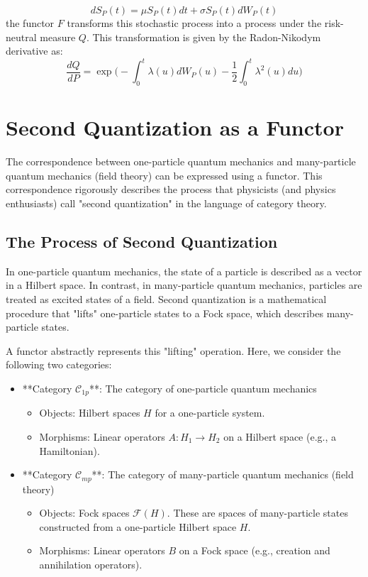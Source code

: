 \documentclass[uplatex,a4j,12pt,dvipdfmx]{jsarticle}
\begin{document}
$$
	d S_{P} (t)
	=
	\mu S_{P} (t) dt
	+
	\sigma S_{P} (t) dW_{P}(t)
$$
the functor $F$ transforms this stochastic process into a process under the risk-neutral measure $Q$. This transformation is given by the Radon-Nikodym derivative as:
$$
	\frac{dQ}{dP}
	=
	\exp \Big(
	- \int_{0}^{t} \lambda(u) d W_{P} (u)
	- \frac{1}{2} \int^{t}_{0} \lambda^{2} (u) du
	\Big)
$$




\section{Second Quantization as a Functor}

The correspondence between one-particle quantum mechanics and many-particle quantum mechanics (field theory) can be expressed using a functor. This correspondence rigorously describes the process that physicists (and physics enthusiasts) call "second quantization" in the language of category theory.

\subsection{The Process of Second Quantization}

In one-particle quantum mechanics, the state of a particle is described as a vector in a Hilbert space. In contrast, in many-particle quantum mechanics, particles are treated as excited states of a field. Second quantization is a mathematical procedure that "lifts" one-particle states to a Fock space, which describes many-particle states.

A functor abstractly represents this "lifting" operation. Here, we consider the following two categories:

\begin{itemize}
	\item **Category $\mathcal{C}_{1p}$**: The category of one-particle quantum mechanics
	  \begin{itemize}
		  \item Objects: Hilbert spaces $H$ for a one-particle system.
		  \item Morphisms: Linear operators $A: H_1 \to H_2$ on a Hilbert space (e.g., a Hamiltonian).
	  \end{itemize}

	\item **Category $\mathcal{C}_{mp}$**: The category of many-particle quantum mechanics (field theory)
	  \begin{itemize}
		  \item Objects: Fock spaces $\mathcal{F}(H)$. These are spaces of many-particle states constructed from a one-particle Hilbert space $H$.
		  \item Morphisms: Linear operators $B$ on a Fock space (e.g., creation and annihilation operators).
	  \end{itemize}
\end{itemize}
\end{document}
